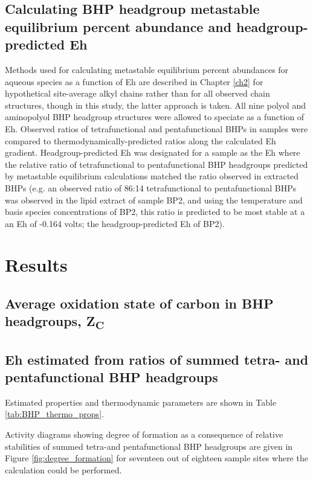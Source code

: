\subsection{Calculating BHP headgroup metastable equilibrium percent abundance and headgroup-predicted Eh}

Methods used for calculating metastable equilibrium percent abundances for aqueous species as a function of Eh are described in Chapter \ref{ch2} for hypothetical site-average alkyl chains rather than for all observed chain structures, though in this study, the latter approach is taken. All nine polyol and aminopolyol BHP headgroup structures were allowed to speciate as a function of Eh. Observed ratios of tetrafunctional and pentafunctional BHPs in samples were compared to thermodynamically-predicted ratios along the calculated Eh gradient. Headgroup-predicted Eh was designated for a sample as the Eh where the relative ratio of tetrafunctional to pentafunctional BHP headgroups predicted by metastable equilibrium calculations matched the ratio observed in extracted BHPs (e.g. an observed ratio of 86:14 tetrafunctional to pentafunctional BHPs was observed in the lipid extract of sample BP2, and using the temperature and basis species concentrations of BP2, this ratio is predicted to be most stable at a an Eh of -0.164 volts; the headgroup-predicted Eh of BP2).



\section{Results}
\subsection{Average oxidation state of carbon in BHP headgroups, Z\textsubscript{C}}

\subsection{Eh estimated from ratios of summed tetra- and pentafunctional BHP headgroups}
Estimated properties and thermodynamic parameters are shown in Table \ref{tab:BHP_thermo_props}.

Activity diagrams showing degree of formation as a consequence of relative stabilities of summed tetra-and pentafunctional BHP headgroups are given in Figure \ref{fig:degree_formation} for seventeen out of eighteen sample sites where the calculation could be performed.


